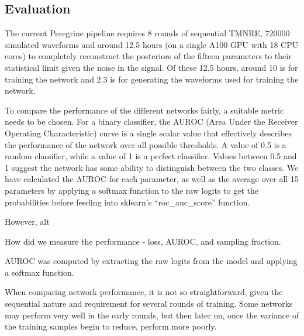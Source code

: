 \subsection{Evaluation}

The current Peregrine pipeline requires 8 rounds of sequential TMNRE, 720000 simulated waveforms and around 12.5 hours (on a single A100 GPU with 18 CPU cores) to completely reconstruct the posteriors of the fifteen parameters to their statistical limit given the noise in the signal. Of these 12.5 hours, around 10 is for training the network and 2.3 is for generating the waveforms used for training the network. 

To compare the performance of the different networks fairly, a suitable metric needs to be chosen. For a binary classifier, the AUROC (Area Under the Receiver Operating Characteristic) curve is a single scalar value that effectively describes the performance of the network over all possible thresholds. A value of 0.5 is a random classifier, while a value of 1 is a perfect classifier. Values between 0.5 and 1 suggest the network has some ability to distinguish between the two classes. We have calculated the AUROC for each parameter, as well as the average over all 15 parameters by applying a softmax function to the raw logits to get the probabilities before feeding into sklearn's \enquote{roc\_auc\_score} function.

However, alt

How did we measure the performance - loss, AUROC, and sampling fraction.

AUROC was computed by extracting the raw logits from the model and applying a softmax function. 


When comparing network performance, it is not so straightforward, given the sequential nature and requirement for several rounds of training. Some networks may perform very well in the early rounds, but then later on, once the variance of the training samples begin to reduce, perform more poorly.

